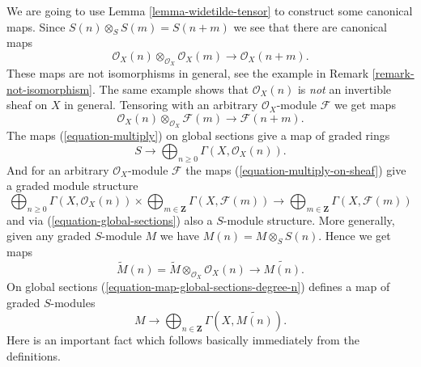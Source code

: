 \noindent
We are going to use Lemma \ref{lemma-widetilde-tensor}
to construct some canonical maps.
Since $S(n) \otimes_S S(m) = S(n + m)$ we see that there
are canonical maps
\begin{equation}
\label{equation-multiply}
\mathcal{O}_X(n) \otimes_{\mathcal{O}_X} \mathcal{O}_X(m)
\longrightarrow
\mathcal{O}_X(n + m).
\end{equation}
These maps are not isomorphisms in general, see the example in
Remark \ref{remark-not-isomorphism}. The same example shows
that $\mathcal{O}_X(n)$ is {\it not} an invertible sheaf on $X$ in
general. Tensoring with an arbitrary $\mathcal{O}_X$-module $\mathcal{F}$
we get maps
\begin{equation}
\label{equation-multiply-on-sheaf}
\mathcal{O}_X(n) \otimes_{\mathcal{O}_X} \mathcal{F}(m)
\longrightarrow
\mathcal{F}(n + m).
\end{equation}
The maps (\ref{equation-multiply}) on global sections give a map of graded
rings
\begin{equation}
\label{equation-global-sections}
S \longrightarrow \bigoplus\nolimits_{n \geq 0} \Gamma(X, \mathcal{O}_X(n)).
\end{equation}
And for an arbitrary $\mathcal{O}_X$-module $\mathcal{F}$ the maps
(\ref{equation-multiply-on-sheaf}) give a graded module structure
\begin{equation}
\label{equation-global-sections-module}
\bigoplus\nolimits_{n \geq 0} \Gamma(X, \mathcal{O}_X(n))
\times
\bigoplus\nolimits_{m \in \mathbf{Z}} \Gamma(X, \mathcal{F}(m))
\longrightarrow
\bigoplus\nolimits_{m \in \mathbf{Z}} \Gamma(X, \mathcal{F}(m))
\end{equation}
and via (\ref{equation-global-sections}) also a $S$-module structure.
More generally, given any graded $S$-module
$M$ we have $M(n) = M \otimes_S S(n)$. Hence we get maps
\begin{equation}
\label{equation-multiply-more-generally}
\widetilde M(n)
=
\widetilde M
\otimes_{\mathcal{O}_X}
\mathcal{O}_X(n)
\longrightarrow
\widetilde{M(n)}.
\end{equation}
On global sections (\ref{equation-map-global-sections-degree-n})
defines a map of graded $S$-modules
\begin{equation}
\label{equation-global-sections-more-generally}
M \longrightarrow
\bigoplus\nolimits_{n \in \mathbf{Z}} \Gamma(X, \widetilde{M(n)}).
\end{equation}
Here is an important fact which follows basically immediately from the
definitions.

